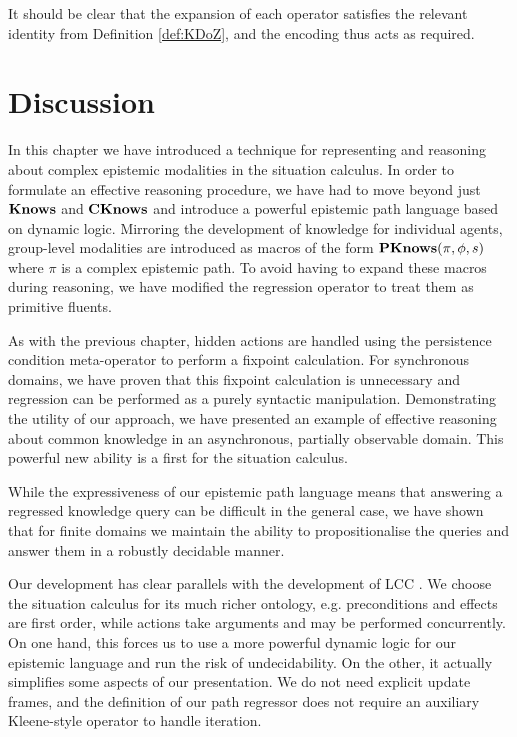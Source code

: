 It should be clear that the expansion of each operator satisfies the
relevant identity from Definition \ref{def:KDoZ}, and the encoding
thus acts as required.


\section{Discussion\label{sec:CKnowledge:Discussion}}

In this chapter we have introduced a technique for representing and
reasoning about complex epistemic modalities in the situation calculus.
In order to formulate an effective reasoning procedure, we have had
to move beyond just $\mathbf{Knows}$ and $\mathbf{CKnows}$ and introduce a powerful
epistemic path language based on dynamic logic. Mirroring the development
of knowledge for individual agents, group-level modalities are introduced
as macros of the form $\mathbf{PKnows}(\pi,\phi,s)$ where $\pi$ is a complex
epistemic path. To avoid having to expand these macros during reasoning,
we have modified the regression operator to treat them as primitive
fluents.

As with the previous chapter, hidden actions are handled using the
persistence condition meta-operator to perform a fixpoint calculation.
For synchronous domains, we have proven that this fixpoint calculation
is unnecessary and regression can be performed as a purely syntactic
manipulation. Demonstrating the utility of our approach, we have presented
an example of effective reasoning about common knowledge in an asynchronous,
partially observable domain. This powerful new ability is a first
for the situation calculus.

While the expressiveness of our epistemic path language means that
answering a regressed knowledge query can be difficult in the general
case, we have shown that for finite domains we maintain the ability
to propositionalise the queries and answer them in a robustly decidable
manner.

Our development has clear parallels with the development of LCC \citep{vanBenthem06lcc}.
We choose the situation calculus for its much richer ontology, e.g.
preconditions and effects are first order, while actions take arguments
and may be performed concurrently. On one hand, this forces us to
use a more powerful dynamic logic for our epistemic language and run
the risk of undecidability. On the other, it actually simplifies some
aspects of our presentation. We do not need explicit update frames,
and the definition of our path regressor does not require an auxiliary
Kleene-style operator to handle iteration.

